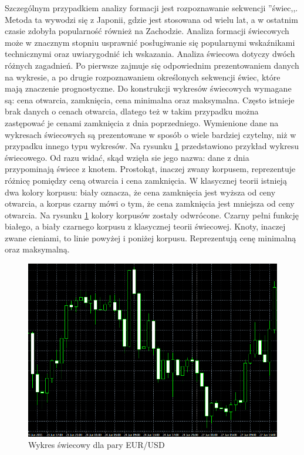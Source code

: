 \documentclass[pdflatex,11pt]{aghdpl}
\begin{document}
Szczególnym przypadkiem analizy formacji jest rozpoznawanie sekwencji ''świec,,. Metoda ta wywodzi się z Japonii, gdzie jest stosowana od wielu lat, a w ostatnim czasie zdobyła popularność również na Zachodzie. Analiza formacji świecowych może w znacznym stopniu usprawnić posługiwanie się popularnymi wskaźnikami technicznymi oraz uwiarygodnić ich wskazania\cite{3}. Analiza świecowa dotyczy dwóch różnych zagadnień. Po pierwsze zajmuje się odpowiednim prezentowaniem danych na wykresie, a po drugie rozpoznawaniem określonych sekwencji świec, które mają znaczenie prognostyczne. Do konstrukcji wykresów świecowych wymagane są: cena otwarcia, zamknięcia, cena minimalna oraz maksymalna. Często istnieje brak danych o cenach otwarcia, dlatego też w takim przypadku można zastępować je cenami zamknięcia z dnia poprzedniego. Wymienione dane na wykresach świecowych są prezentowane w sposób o wiele bardziej czytelny, niż w przypadku innego typu wykresów. Na rysunku \ref{swieca} przedstawiono przykład wykresu świecowego. Od razu widać, skąd wzięła sie jego nazwa: dane z dnia przypominają świece z knotem. Prostokąt, inaczej zwany korpusem, reprezentuje różnicę pomiędzy ceną otwarcia i cena zamknięcia. W klasycznej teorii istnieją dwa kolory korpusu: biały oznacza, że cena zamknięcia jest wyższa od ceny otwarcia, a korpus czarny mówi o tym, że cena zamknięcia jest mniejsza od ceny otwarcia. Na rysunku \ref{swieca} kolory korpusów zostały odwrócone. Czarny pełni funkcję białego, a biały czarnego korpusu z klasycznej teorii świecowej. Knoty, inaczej zwane cieniami, to linie powyżej i poniżej korpusu. Reprezentują cenę minimalną oraz maksymalną. 
\begin{figure}[ht]
\begin{center}
\includegraphics[width=15cm]{candles.png}
\caption{Wykres świecowy dla pary EUR/USD}
\label{swieca}
\end{center}
\end{figure} 
\end{document}
